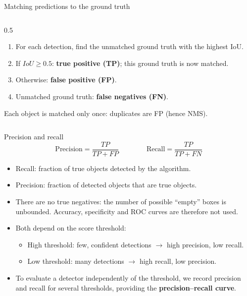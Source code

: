 \documentclass[xcolor=pdftex,dvipsnames,table]{beamer}
\begin{document}
\begin{frame}{Matching predictions to the ground truth}
\begin{columns}[T]
\begin{column}{0.5\textwidth}
\begin{enumerate}
  \item For each detection, find the unmatched ground truth with the highest IoU.
  \item If $IoU \geq 0.5$: \textbf{true positive (TP)}; this ground truth is now matched.
  \item Otherwise: \textbf{false positive (FP)}.
  \item Unmatched ground truth: \textbf{false negatives (FN)}.
\end{enumerate}
\vspace{.1cm}
Each object is matched only once: duplicates are FP (hence NMS).
\end{column}
\end{columns}
\end{frame}

\begin{frame}{Precision and recall}
\begin{equation*}
\text{Precision} = \frac{TP}{TP+FP}
\qquad\qquad
\text{Recall} = \frac{TP}{TP+FN}
\end{equation*}
\begin{itemize}
  \item Recall: fraction of true objects detected by the algorithm.
  \item Precision: fraction of detected objects that are true objects.
  \item There are no true negatives: the number of possible ``empty'' boxes is unbounded. Accuracy, specificity and ROC curves are therefore not used.
  \item Both depend on the score threshold:
  \begin{itemize}
    \item High threshold: few, confident detections $\rightarrow$ high precision, low recall.
    \item Low threshold: many detections $\rightarrow$ high recall, low precision.
  \end{itemize}
  \item To evaluate a detector independently of the threshold, we record precision and recall for several thresholds, providing the \textbf{precision--recall curve}.
\end{itemize}
\end{frame}
\end{document}
